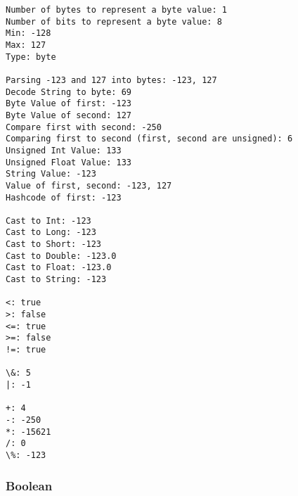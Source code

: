 \documentclass[11pt]{article}
\begin{document}
    \begin{Verbatim}[commandchars=\\\{\}]
Number of bytes to represent a byte value: 1
Number of bits to represent a byte value: 8
Min: -128
Max: 127
Type: byte

Parsing -123 and 127 into bytes: -123, 127
Decode String to byte: 69
Byte Value of first: -123
Byte Value of second: 127
Compare first with second: -250
Comparing first to second (first, second are unsigned): 6
Unsigned Int Value: 133
Unsigned Float Value: 133
String Value: -123
Value of first, second: -123, 127
Hashcode of first: -123

Cast to Int: -123
Cast to Long: -123
Cast to Short: -123
Cast to Double: -123.0
Cast to Float: -123.0
Cast to String: -123

<: true
>: false
<=: true
>=: false
!=: true

\&: 5
|: -1

+: 4
-: -250
*: -15621
/: 0
\%: -123
    \end{Verbatim}

    \hypertarget{boolean}{%
\subsubsection{Boolean}\label{boolean}}
\end{document}
